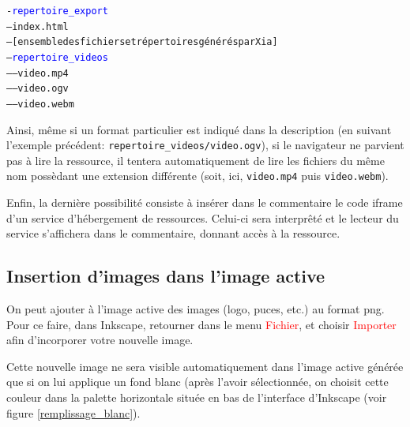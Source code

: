 \documentclass[a4paper,12pt]{report}
\newcommand{\chemin}[1]{\textcolor{red}{#1}}
\begin{document}
\parbox{0.40\textwidth}
{
\begin{alltt}
 -\textcolor{blue}{repertoire\_export}\\
 ---index.html\\
 ---[ensemble des fichiers et répertoires générés par Xia]\\
 ---\textcolor{blue}{repertoire\_videos}\\
 -----video.mp4\\
 -----video.ogv\\
 -----video.webm\\
\end{alltt}
}


Ainsi, même si un format particulier est indiqué dans la description (en suivant l'exemple précédent: \verb|repertoire_videos/video.ogv|),
si le navigateur ne parvient pas à lire la ressource, il tentera automatiquement de lire les fichiers du même nom 
possèdant une extension différente (soit, ici, \verb|video.mp4| puis \verb|video.webm|).

Enfin, la dernière possibilité consiste à insérer dans le commentaire le code iframe d'un service d'hébergement de ressources.
Celui-ci sera interprêté et le lecteur du service s'affichera dans le commentaire, donnant accès à la ressource.

\subsection{Insertion d'images dans l'image active}

On peut ajouter à l'image active des images (logo, puces, etc.) au format png.
Pour ce faire, dans Inkscape, retourner dans le menu \chemin{Fichier}, et choisir \chemin{Importer}
afin d'incorporer votre nouvelle image.

Cette nouvelle image ne sera visible automatiquement dans l'image active générée
que si on lui applique un fond blanc (après l'avoir sélectionnée, on choisit cette couleur dans la palette
horizontale située en bas de l'interface d'Inkscape (voir figure \ref{remplissage_blanc}).
\end{document}
